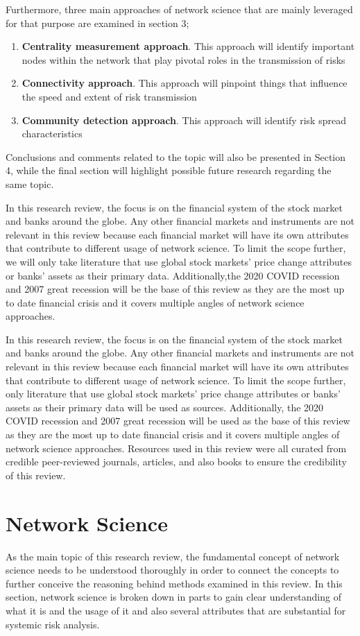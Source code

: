 \documentclass[a4paper,11pt]{article}
\begin{document}
Furthermore, three main approaches of network science that are mainly leveraged for that purpose are examined in section 3; 
\begin{enumerate}
        \item \textbf{Centrality measurement approach}. This approach will identify important nodes within the network that play pivotal roles in the transmission of risks
        \item \textbf{Connectivity approach}. This approach will pinpoint things that influence the speed and extent of risk transmission
        \item \textbf{Community detection approach}. This approach will identify risk spread characteristics
\end{enumerate}
Conclusions and comments related to the topic will also be presented in Section 4, while the final section will highlight possible future research regarding the same topic.

In this research review, the focus is on the financial system of the stock market and banks around the globe. Any other financial markets and instruments are not relevant in this review because each financial market will have its own attributes that contribute to different usage of network science. To limit the scope further, we will only take literature that use global stock markets’ price change attributes or banks’ assets as their primary data. Additionally,the 2020 COVID recession and 2007 great recession will be the base of this review as they are the most up to date financial crisis and it covers multiple angles of network science approaches.

In this research review, the focus is on the financial system of the stock market and banks around the globe. Any other financial markets and instruments are not relevant in this review because each financial market will have its own attributes that contribute to different usage of network science. To limit the scope further, only literature that use global stock markets’ price change attributes or banks’ assets as their primary data will be used as sources. Additionally, the 2020 COVID recession and 2007 great recession will be used as the base of this review as they are the most up to date financial crisis and it covers multiple angles of network science approaches. Resources used in this review were all curated from credible peer-reviewed journals, articles, and also books  to ensure the credibility of this review.

\section{Network Science}
As the main topic of this research review, the fundamental concept of network science needs to be understood thoroughly in order to connect the concepts to further conceive the reasoning behind methods examined in this review. In this section, network science is broken down in parts to gain clear understanding of what it is and the usage of it and also several attributes that are substantial for systemic risk analysis.
\end{document}
